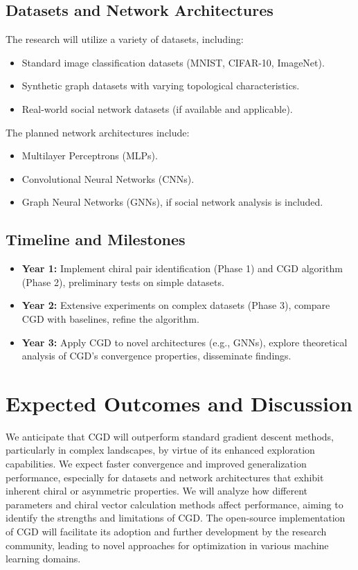 \documentclass[12pt, a4paper]{article}
\begin{document}
\subsection{Datasets and Network Architectures}

The research will utilize a variety of datasets, including:

\begin{itemize}
    \item Standard image classification datasets (MNIST, CIFAR-10, ImageNet).
    \item Synthetic graph datasets with varying topological characteristics.
    \item Real-world social network datasets (if available and applicable).
\end{itemize}


The planned network architectures include:

\begin{itemize}
    \item Multilayer Perceptrons (MLPs).
    \item Convolutional Neural Networks (CNNs).
    \item Graph Neural Networks (GNNs), if social network analysis is included.
\end{itemize}



\subsection{Timeline and Milestones}
\begin{itemize}
    \item \textbf{Year 1:} Implement chiral pair identification (Phase 1) and CGD algorithm (Phase 2), preliminary tests on simple datasets.
    \item \textbf{Year 2:}  Extensive experiments on complex datasets (Phase 3), compare CGD with baselines, refine the algorithm.
    \item \textbf{Year 3:}  Apply CGD to novel architectures (e.g., GNNs), explore theoretical analysis of CGD's convergence properties, disseminate findings.
\end{itemize}


\section{Expected Outcomes and Discussion}

We anticipate that CGD will outperform standard gradient descent methods, particularly in complex landscapes, by virtue of its enhanced exploration capabilities.  We expect faster convergence and improved generalization performance, especially for datasets and network architectures that exhibit inherent chiral or asymmetric properties. We will analyze how different parameters and chiral vector calculation methods affect performance, aiming to identify the strengths and limitations of CGD. The open-source implementation of CGD will facilitate its adoption and further development by the research community, leading to novel approaches for optimization in various machine learning domains.
\end{document}
